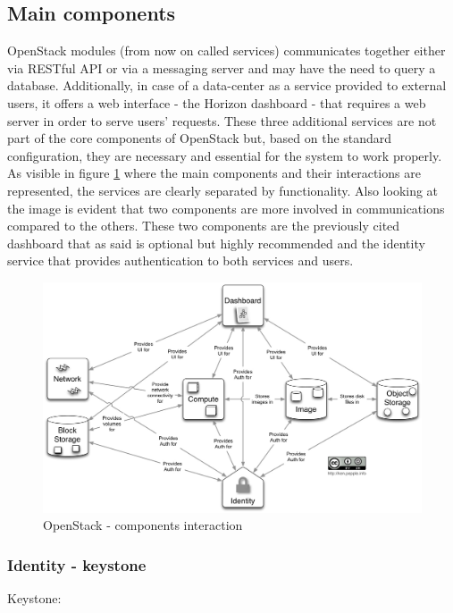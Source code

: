 \subsection{Main components}
\label{a:main_components}
OpenStack modules (from now on called services) communicates together either via RESTful API or via a messaging server and may have the need to query a database. Additionally, in case of a data-center as a service provided to external users, it offers a web interface - the Horizon dashboard - that requires a web server in order to serve users' requests.
These three additional services are not part of the core components of OpenStack but, based on the standard configuration, they are necessary and essential for the system to work properly.
As visible in figure \ref{fig:OS_components_interraction_logical} where the main components and their interactions are represented, the services are clearly separated by functionality. Also looking at the image is evident that two components are more involved in communications compared to the others. These two components are the previously cited dashboard that as said is optional but highly recommended and the identity service that provides authentication to both services and users.
\begin{figure}[h]
	\centering
	\includegraphics[clip= true, width= \columnwidth]{images/openstack_core_components.jpg}
	\caption{OpenStack - components interaction}
	\label{fig:OS_components_interraction_logical}
\end{figure}
\subsubsection{Identity - keystone}
\label{sec:keystone}
Keystone:




